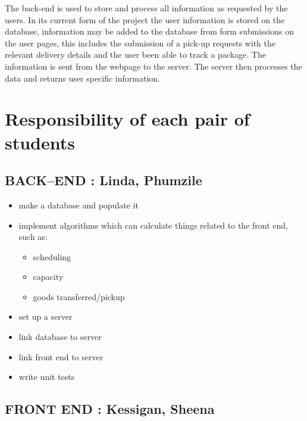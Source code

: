 \documentclass[paper=a4, fontsize=11pt]{scrartcl} %
\numberwithin{equation}{section} %
\numberwithin{figure}{section} %
\numberwithin{table}{section} %
\begin{document}
\break

The back-end is used to store and process all information as requested by the users. In its current form of the project the user information is stored on the database, information may be added to the database from form submissions on the user pages, this includes the submission of a pick-up requests with the relevant delivery details and the user been able to track a package. The information is sent from the webpage to the server. The server then processes the data and returns user specific information.


\section{Responsibility of each pair of students}

\subsection{	BACK--END : Linda, Phumzile}


\begin{itemize}
	\item  make a database and populate it
	\item  implement algorithms which can calculate things related to the front end, such as:
		\begin{itemize}
		 \item scheduling
		\item capacity
		\item goods transferred/pickup 
		\end{itemize}
	\item set up a server
	\item link database to server
	\item	link front end to server
	\item	write unit tests  
\end{itemize}




\subsection{	FRONT END : Kessigan, Sheena}
\end{document}
